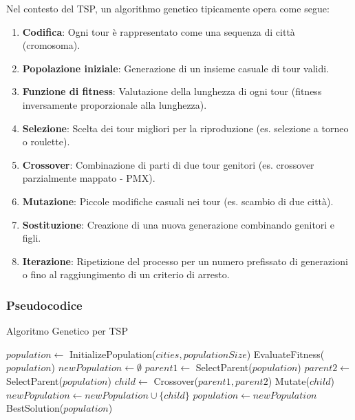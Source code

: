Nel contesto del \gls{TSP}, un algorithmo genetico tipicamente opera come segue:

\begin{enumerate}
	\item \textbf{Codifica}: Ogni tour è rappresentato come una sequenza di città (cromosoma).
	\item \textbf{Popolazione iniziale}: Generazione di un insieme casuale di tour validi.
	\item \textbf{Funzione di fitness}: Valutazione della lunghezza di ogni tour (fitness inversamente proporzionale alla lunghezza).
	\item \textbf{Selezione}: Scelta dei tour migliori per la riproduzione (es. selezione a torneo o roulette).
	\item \textbf{Crossover}: Combinazione di parti di due tour genitori (es. crossover parzialmente mappato - PMX).
	\item \textbf{Mutazione}: Piccole modifiche casuali nei tour (es. scambio di due città).
	\item \textbf{Sostituzione}: Creazione di una nuova generazione combinando genitori e figli.
	\item \textbf{Iterazione}: Ripetizione del processo per un numero prefissato di generazioni o fino al raggiungimento di un criterio di arresto.
\end{enumerate}

\subsubsection{Pseudocodice}


\begin{algorithm}
	\caption{Algoritmo Genetico per \gls{TSP}}\label{alg:geneticalgorithm}
	\begin{algorithmic}[1]
		\State $population \gets$ InitializePopulation($cities, populationSize$)
		\State EvaluateFitness($population$)
		\State $newPopulation \gets \emptyset$
		\State $parent1 \gets$ SelectParent($population$)
		\State $parent2 \gets$ SelectParent($population$)
		\State $child \gets$ Crossover($parent1, parent2$)
		\State Mutate($child$)
		\EndIf
		\State $newPopulation \gets newPopulation \cup \{child\}$
		\EndWhile
		\State $population \gets newPopulation$
		\EndFor
		\State \Return BestSolution($population$)
		\EndProcedure
	\end{algorithmic}
\end{algorithm}
\pagebreak
